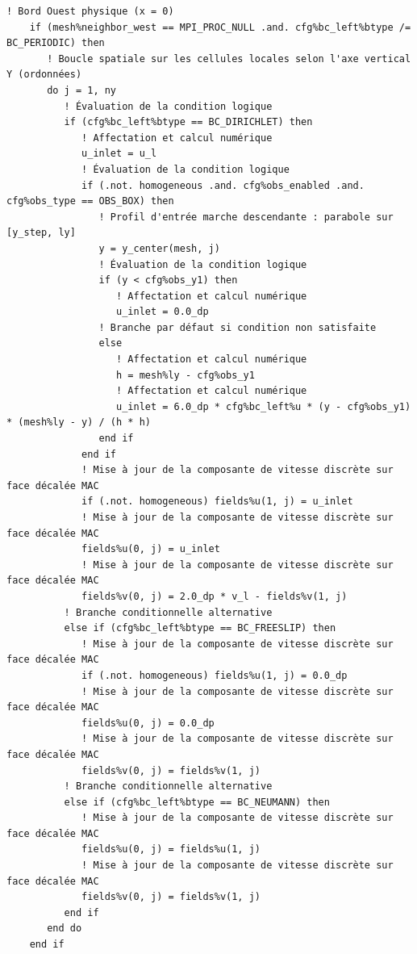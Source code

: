 \documentclass[10pt,a4paper,oneside]{book}
\begin{document}
\begin{lstlisting}[language={[95]Fortran}]
    ! Bord Ouest physique (x = 0)
    if (mesh%neighbor_west == MPI_PROC_NULL .and. cfg%bc_left%btype /= BC_PERIODIC) then
       ! Boucle spatiale sur les cellules locales selon l'axe vertical Y (ordonnées)
       do j = 1, ny
          ! Évaluation de la condition logique
          if (cfg%bc_left%btype == BC_DIRICHLET) then
             ! Affectation et calcul numérique
             u_inlet = u_l
             ! Évaluation de la condition logique
             if (.not. homogeneous .and. cfg%obs_enabled .and. cfg%obs_type == OBS_BOX) then
                ! Profil d'entrée marche descendante : parabole sur [y_step, ly]
                y = y_center(mesh, j)
                ! Évaluation de la condition logique
                if (y < cfg%obs_y1) then
                   ! Affectation et calcul numérique
                   u_inlet = 0.0_dp
                ! Branche par défaut si condition non satisfaite
                else
                   ! Affectation et calcul numérique
                   h = mesh%ly - cfg%obs_y1
                   ! Affectation et calcul numérique
                   u_inlet = 6.0_dp * cfg%bc_left%u * (y - cfg%obs_y1) * (mesh%ly - y) / (h * h)
                end if
             end if
             ! Mise à jour de la composante de vitesse discrète sur face décalée MAC
             if (.not. homogeneous) fields%u(1, j) = u_inlet
             ! Mise à jour de la composante de vitesse discrète sur face décalée MAC
             fields%u(0, j) = u_inlet
             ! Mise à jour de la composante de vitesse discrète sur face décalée MAC
             fields%v(0, j) = 2.0_dp * v_l - fields%v(1, j)
          ! Branche conditionnelle alternative
          else if (cfg%bc_left%btype == BC_FREESLIP) then
             ! Mise à jour de la composante de vitesse discrète sur face décalée MAC
             if (.not. homogeneous) fields%u(1, j) = 0.0_dp
             ! Mise à jour de la composante de vitesse discrète sur face décalée MAC
             fields%u(0, j) = 0.0_dp
             ! Mise à jour de la composante de vitesse discrète sur face décalée MAC
             fields%v(0, j) = fields%v(1, j)
          ! Branche conditionnelle alternative
          else if (cfg%bc_left%btype == BC_NEUMANN) then
             ! Mise à jour de la composante de vitesse discrète sur face décalée MAC
             fields%u(0, j) = fields%u(1, j)
             ! Mise à jour de la composante de vitesse discrète sur face décalée MAC
             fields%v(0, j) = fields%v(1, j)
          end if
       end do
    end if


\end{lstlisting}
\end{document}
